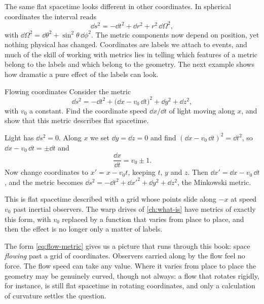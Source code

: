 The same flat spacetime looks different in other coordinates. In spherical
coordinates the interval reads
\begin{equation}
  \dd s^{2} = -\dd t^{2} + \dd r^{2} + r^{2}\,\dd\Omega^{2},
  \label{eq:flat-spherical}
\end{equation}
with $\dd\Omega^{2} = \dd\theta^{2} + \sin^{2}\theta\,\dd\phi^{2}$. The metric
components now depend on position, yet nothing physical has changed.
Coordinates are labels we attach to events, and much of the skill of working
with metrics lies in telling which features of a metric belong to the labels
and which belong to the geometry. The next example shows how dramatic a pure
effect of the labels can look.

\begin{example}[label=ex:flow]{Flowing coordinates}
Consider the metric
\begin{equation}
  \dd s^{2} = -\dd t^{2} + \bigl(\dd x - v_{0}\,\dd t\bigr)^{2} + \dd y^{2} + \dd z^{2},
  \label{eq:flow-metric}
\end{equation}
with $v_{0}$ a constant. Find the coordinate speed $\dd x/\dd t$ of light moving
along $x$, and show that this metric describes flat spacetime.

\solution Light has $\dd s^{2} = 0$. Along $x$ we set $\dd y = \dd z = 0$ and
find $(\dd x - v_{0}\,\dd t)^{2} = \dd t^{2}$, so $\dd x - v_{0}\,\dd t = \pm\dd t$
and
\begin{equation*}
  \frac{\dd x}{\dd t} = v_{0} \pm 1.
\end{equation*}
Now change coordinates to $x' = x - v_{0}t$, keeping $t$, $y$ and $z$. Then
$\dd x' = \dd x - v_{0}\,\dd t$, and the metric becomes
$\dd s^{2} = -\dd t^{2} + \dd x'^{2} + \dd y^{2} + \dd z^{2}$, the Minkowski
metric.

\discussion This is flat spacetime described with a grid whose points slide
along $-x$ at speed $v_{0}$ past inertial observers. The warp drives of
\cref{ch:what-is} have metrics of exactly this form, with $v_{0}$ replaced by a
function that varies from place to place, and then the effect is no longer
only a matter of labels.
\end{example}

The form \cref{eq:flow-metric} gives us a picture that runs through this book:
space \emph{flowing} past a grid of coordinates. Observers carried along by the
flow feel no force. The flow speed can take any value. Where it varies from
place to place the geometry may be genuinely curved, though not always: a flow
that rotates rigidly, for instance, is still flat spacetime in rotating
coordinates, and only a calculation of curvature settles the question.

